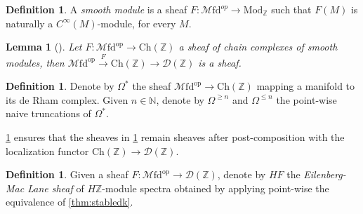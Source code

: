 \documentclass[10pt]{amsart}
\newcommand{\D}{\mathscr{D}}
\newcommand{\bN}{\mathbb{N}}
\newcommand{\bZ}{\mathbb{Z}}
\newcommand{\Ch}{\mathrm{Ch}}
\newcommand{\Mfd}{\mathscr{M}\mathrm{fd}}
\newcommand{\Mod}{\mathrm{Mod}}
\newcommand{\op}{\mathrm{op}}
\newtheorem{lemma}[equation]{Lemma}
\theoremstyle{definition}
\newtheorem{definition}[equation]{Definition}
\theoremstyle{remark}
\numberwithin{equation}{section}
\begin{document}
\begin{definition}
  A \emph{smooth module} is a sheaf $F:\Mfd^{op}\to\Mod_\bZ$ such that $F(M)$ is naturally a $C^\infty(M)$-module, for every $M$.  
\end{definition}
\begin{lemma}[{\cite[Lemma 7.12]{bunkenikolausvoelkl2016diffcoh}}]\label{lem:sheafloc}
  Let $F:\Mfd^{\op}\to\Ch(\bZ)$ a sheaf of chain complexes of smooth modules, then $\Mfd^{\op}\xrightarrow{F}\Ch(\bZ)\to\D(\bZ)$ is a sheaf. 
\end{lemma}
\begin{definition}\label{def:forms}
  Denote by $\Omega^*$ the sheaf $\Mfd^{\op}\to\Ch(\bZ)$ mapping a manifold to its de Rham complex. Given $n\in\bN$, denote by $\Omega^{\geq n}$ and $\Omega^{\leq n}$ the point-wise naive truncations of $\Omega^*$. 
\end{definition}
\cref{lem:sheafloc} ensures that the sheaves in \cref{def:forms} remain sheaves after post-composition with the localization functor $\Ch(\bZ)\to\D(\bZ)$.  
\begin{definition}\label{def:EMsheaf}
  Given a sheaf $F:\Mfd^{\op}\to\D(\bZ)$, denote by $HF$ the \emph{Eilenberg-Mac Lane sheaf} of $H\bZ$-module spectra obtained by applying point-wise the equivalence of \cref{thm:stabledk}. 
\end{definition}
\end{document}
